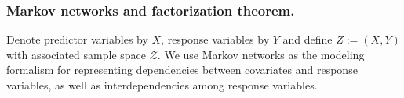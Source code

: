 \documentclass[leqno, a4paper,12pt]{article}
\begin{document}
\subsubsection{Markov networks and factorization theorem.} Denote predictor
variables by $X$, response variables by $Y$ and define $Z := (X,Y)$
with associated sample space $\mathcal{Z}$. We use Markov networks as the modeling formalism for representing dependencies between covariates and
response variables, as well as interdependencies among response variables.
\end{document}

